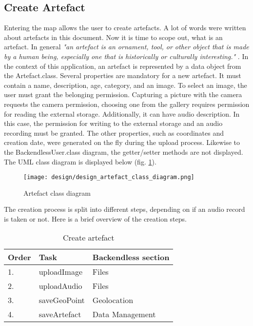 \subsection{Create Artefact}
Entering the map allows the user to create artefacts. A lot of words were written about artefacts in this document. Now it is time to scope out, what is an artefact. In general \textit{"an artefact is an ornament, tool, or other object that is made by a human being, especially one that is historically or culturally interesting."} \cite{artefact}. In the context of this application, an artefact is represented by a data object from the Artefact.class. Several properties are mandatory for a new artefact. It must contain a name, description, age, category, and an image. To select an image, the user must grant the belonging permission. Capturing a picture with the camera requests the camera permission, choosing one from the gallery requires permission for reading the external storage. Additionally, it can have audio description. In this case, the permission for writing to the external storage and an audio recording must be granted. 
The other properties, such as coordinates and creation date, were generated on the fly during the upload process. Likewise to the BackendlessUser.class diagram, the getter/setter methods are not displayed. The UML class diagram is displayed below (fig. \ref{fig:design_artefact_class_diagram}).

\begin{figure}[H]
    \centering \texttt{[image: design/design\_artefact\_class\_diagram.png]}
    \caption{Artefact class diagram}    
    \label{fig:design_artefact_class_diagram}
\end{figure}

The creation process is split into different steps, depending on if an audio record is taken or not. Here is a brief overview of the creation steps. 

\begin{table}[h]
\centering
\begin{tabular}{|l|l|l|}
\hline
\textbf{Order} & \textbf{Task} & \textbf{Backendless section} \\ \hline
1.             & uploadImage   & Files                        \\ \hline
2.             & uploadAudio   & Files                        \\ \hline
3.             & saveGeoPoint  & Geolocation                  \\ \hline
4.             & saveArtefact  & Data Management              \\ \hline
\end{tabular}
\caption{Create artefact}
\label{table:create_artefact}
\end{table}

